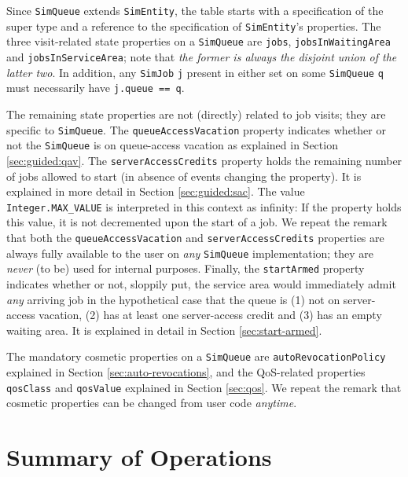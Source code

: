 Since \lstinline|SimQueue| extends \lstinline|SimEntity|,
  the table starts with a specification of the super type
  and a reference to the specification of
  \lstinline|SimEntity|'s properties.
The three visit-related state properties
  on a \lstinline|SimQueue|
  are \lstinline|jobs|,
  \lstinline|jobsInWaitingArea|
  and \lstinline|jobsInServiceArea|;
  note that
  {\em the former
       is always the disjoint union
       of the latter two}.
In addition, any \lstinline|SimJob|
  \lstinline|j| present in
  either set
  on some \lstinline|SimQueue| \lstinline|q|
  must necessarily have
  \lstinline|j.queue == q|.
  
The remaining state properties are not
  (directly) related to job visits;
  they are specific to \lstinline|SimQueue|.
The \lstinline|queueAccessVacation| property
  indicates whether or not the \lstinline|SimQueue|
  is on queue-access vacation
  as explained in Section \ref{sec:guided:qav}.
The \lstinline|serverAccessCredits| property
  holds the remaining number of jobs
  allowed to start (in absence of events
  changing the property).
It is explained in more detail
  in Section \ref{sec:guided:sac}.
The value \lstinline|Integer.MAX_VALUE|
  is interpreted in this context as infinity:
If the property holds this value,
  it is not decremented
  upon the start of a job.
We repeat the remark that
  both the \lstinline|queueAccessVacation|
  and \lstinline|serverAccessCredits|
  properties
  are always fully available to the user
  on {\em any\/} \lstinline|SimQueue|
  implementation;
  they are {\em never\/}
  (to be) used for internal purposes. 
Finally,
  the \lstinline|startArmed| property
  indicates whether or not,
  sloppily put,
  the service area would immediately
  admit {\em any\/} arriving job
  in the hypothetical case that
  the queue is (1) not on server-access vacation,
  (2) has at least one server-access credit
  and (3) has an empty waiting area.
It is explained in detail in Section \ref{sec:start-armed}.

The mandatory cosmetic properties on a \lstinline|SimQueue|
  are \lstinline|autoRevocationPolicy|
  explained in Section \ref{sec:auto-revocations},
  and the QoS-related properties
  \lstinline|qosClass| and \lstinline|qosValue|
  explained in Section \ref{sec:qos}.
We repeat the remark that cosmetic
  properties can be changed from user code
  {\em anytime}.

\section{Summary of Operations}
         
